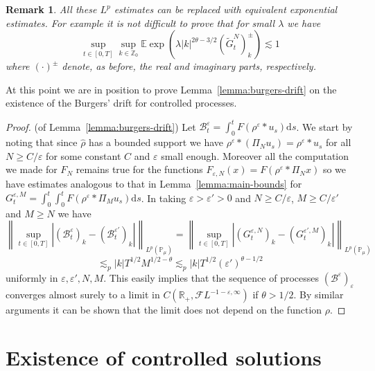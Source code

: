 \documentclass[11pt,a4paper,reqno]{amsart}
\newtheorem{remark}{Remark}
\newcommand{\PP}{\mathbb{P}}
\newcommand{\RR}{\mathbb{R}}
\newcommand{\ZZ}{\mathbb{Z}}
\newcommand{\expect}{\mathbb{E}}
\newcommand{\cF}{\mathcal{F}}
\newcommand{\dd}{\mathrm{d}}
\newcommand{\eps}{\varepsilon}
\begin{document}
\begin{remark}
All these $L^p$ estimates can be replaced with equivalent exponential estimates. For example it is not difficult to prove that for small $\lambda$ we have
$$
\sup_{t\in[0,T]} \sup_{k\in\ZZ_0} \expect \exp\left(\lambda |k|^{2\theta-3/2} (\tilde G^N_t)^\pm_k \right) \lesssim 1
$$
where $(\cdot)^\pm$ denote, as before, the real and imaginary parts, respectively.
\end{remark} 

At this point we are in position to prove Lemma~\ref{lemma:burgers-drift} on the existence of the Burgers' drift for controlled processes.

\begin{proof}(of Lemma~\ref{lemma:burgers-drift})
Let $\mathcal{B}^\eps_t = \int_0^t  F(\rho^\eps* u_s) \dd s$. 
We start by noting that since $\hat \rho$ has a bounded support we have $\rho^\eps * (\Pi_N u_s) = \rho^\eps * u_s$ for  all $N \ge C/\eps$ for some constant $C$ and $\eps$ small enough. Moreover all the computation we made for $F_N$ remains true for the functions $F_{\eps,N}(x) = F(\rho^\eps * \Pi_N x)$ so we have estimates analogous to that in  Lemma~\ref{lemma:main-bounds} for 
$G^{\eps,M}_t = \int_0^t \int_0^t  F(\rho^\eps* \Pi_M u_s) \dd s$. In taking $\eps>\eps'>0$ and $N\ge C/\eps$, $M\ge C/\eps'$ and $M\ge N$ we have
$$
\left\|\sup_{t\in[0,T]}\left|(\mathcal{B}^\eps_t)_k-(\mathcal{B}^{\eps'}_t)_k\right| \right\|_{L^p(\PP_\mu)}
=
\left\|\sup_{t\in[0,T]}\left|(G^{\eps,N}_t)_k-(G^{\eps',M}_t)_k\right|\right \|_{L^p(\PP_\mu)}
$$
$$
\lesssim_p |k| T^{1/2} M^{1/2-\theta} \lesssim_p |k| T^{1/2} (\eps')^{\theta-1/2} 
$$
uniformly in $\eps,\eps',N,M$. This easily implies that the sequence of processes $(\mathcal{B}^\eps)_{\eps}$ converges almost surely to a limit in $C(\RR_+,\cF L^{-1-\eps,\infty})$ if $\theta>1/2$. By similar arguments it can be shown that the limit does not depend on the function $\rho$. 
\end{proof}



\section{Existence of controlled solutions}
\label{sec:existence}
\end{document}
